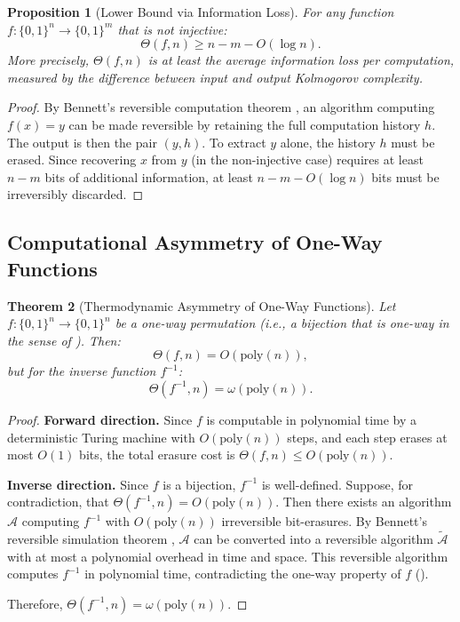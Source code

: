 \documentclass[12pt, a4paper]{article}
\theoremstyle{plain}
\newtheorem{theorem}{Theorem}[section]
\newtheorem{proposition}[theorem]{Proposition}
\theoremstyle{definition}
\theoremstyle{remark}
\newcommand{\poly}{\mathrm{poly}}
\begin{document}
\begin{proposition}[Lower Bound via Information Loss]\label{prop:info_loss}
  For any function $f: \{0,1\}^n \to \{0,1\}^m$ that is not injective:
  \begin{equation}\label{eq:info_loss}
    \Theta(f, n) \geq n - m - O(\log n).
  \end{equation}
  More precisely, $\Theta(f, n)$ is at least the average information
  loss per computation, measured by the difference between input and
  output Kolmogorov complexity.
\end{proposition}

\begin{proof}
  By Bennett's reversible computation theorem \citep{Bennett1973}, an
  algorithm computing $f(x) = y$ can be made reversible by retaining
  the full computation history $h$. The output is then the pair $(y, h)$.
  To extract $y$ alone, the history $h$ must be erased. Since recovering
  $x$ from $y$ (in the non-injective case) requires at least $n - m$
  bits of additional information, at least $n - m - O(\log n)$ bits must
  be irreversibly discarded.
\end{proof}

\subsection{Computational Asymmetry of One-Way Functions}

\begin{theorem}[Thermodynamic Asymmetry of One-Way Functions]\label{thm:asymmetry}
  Let $f: \{0,1\}^n \to \{0,1\}^n$ be a one-way permutation (i.e., a
  bijection that is one-way in the sense of ). Then:
  \begin{equation}\label{eq:asymmetry}
    \Theta(f, n) = O(\poly(n)),
  \end{equation}
  but for the inverse function $f^{-1}$:
  \begin{equation}\label{eq:inverse_cost}
    \Theta(f^{-1}, n) = \omega(\poly(n)).
  \end{equation}
\end{theorem}

\begin{proof}
  \textbf{Forward direction.} Since $f$ is computable in polynomial time
  by a deterministic Turing machine with $O(\poly(n))$ steps, and each
  step erases at most $O(1)$ bits, the total erasure cost is
  $\Theta(f, n) \leq O(\poly(n))$.

  \textbf{Inverse direction.} Since $f$ is a bijection, $f^{-1}$ is
  well-defined. Suppose, for contradiction, that $\Theta(f^{-1}, n) = O(\poly(n))$.
  Then there exists an algorithm $\mathcal{A}$ computing $f^{-1}$
  with $O(\poly(n))$ irreversible bit-erasures. By Bennett's
  reversible simulation theorem \citep{Bennett1973}, $\mathcal{A}$ can
  be converted into a reversible algorithm $\widetilde{\mathcal{A}}$ with
  at most a polynomial overhead in time and space. This reversible
  algorithm computes $f^{-1}$ in polynomial time, contradicting the
  one-way property of $f$ ().

  Therefore, $\Theta(f^{-1}, n) = \omega(\poly(n))$.
\end{proof}
\end{document}
